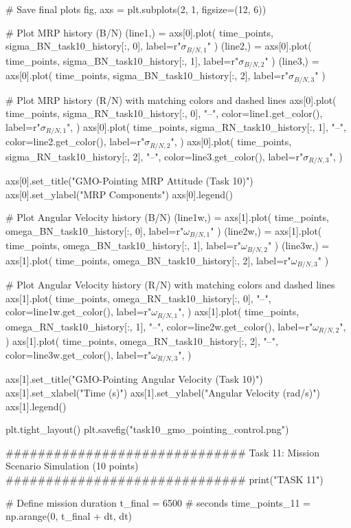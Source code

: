 \documentclass[conf]{new-aiaa}
\begin{document}
\begin{pythoncode}
# Save final plots
fig, axs = plt.subplots(2, 1, figsize=(12, 6))

# Plot MRP history (B/N)
(line1,) = axs[0].plot(
    time_points, sigma_BN_task10_history[:, 0], label=r"$\sigma_{B/N,1}$"
)
(line2,) = axs[0].plot(
    time_points, sigma_BN_task10_history[:, 1], label=r"$\sigma_{B/N,2}$"
)
(line3,) = axs[0].plot(
    time_points, sigma_BN_task10_history[:, 2], label=r"$\sigma_{B/N,3}$"
)

# Plot MRP history (R/N) with matching colors and dashed lines
axs[0].plot(
    time_points,
    sigma_RN_task10_history[:, 0],
    "--",
    color=line1.get_color(),
    label=r"$\sigma_{R/N,1}$",
)
axs[0].plot(
    time_points,
    sigma_RN_task10_history[:, 1],
    "--",
    color=line2.get_color(),
    label=r"$\sigma_{R/N,2}$",
)
axs[0].plot(
    time_points,
    sigma_RN_task10_history[:, 2],
    "--",
    color=line3.get_color(),
    label=r"$\sigma_{R/N,3}$",
)

axs[0].set_title("GMO-Pointing MRP Attitude (Task 10)")
axs[0].set_ylabel("MRP Components")
axs[0].legend()

# Plot Angular Velocity history (B/N)
(line1w,) = axs[1].plot(
    time_points, omega_BN_task10_history[:, 0], label=r"$\omega_{B/N,1}$"
)
(line2w,) = axs[1].plot(
    time_points, omega_BN_task10_history[:, 1], label=r"$\omega_{B/N,2}$"
)
(line3w,) = axs[1].plot(
    time_points, omega_BN_task10_history[:, 2], label=r"$\omega_{B/N,3}$"
)

# Plot Angular Velocity history (R/N) with matching colors and dashed lines
axs[1].plot(
    time_points,
    omega_RN_task10_history[:, 0],
    "--",
    color=line1w.get_color(),
    label=r"$\omega_{R/N,1}$",
)
axs[1].plot(
    time_points,
    omega_RN_task10_history[:, 1],
    "--",
    color=line2w.get_color(),
    label=r"$\omega_{R/N,2}$",
)
axs[1].plot(
    time_points,
    omega_RN_task10_history[:, 2],
    "--",
    color=line3w.get_color(),
    label=r"$\omega_{R/N,3}$",
)

axs[1].set_title("GMO-Pointing Angular Velocity (Task 10)")
axs[1].set_xlabel("Time (s)")
axs[1].set_ylabel("Angular Velocity (rad/s)")
axs[1].legend()

plt.tight_layout()
plt.savefig("task10_gmo_pointing_control.png")


############################## Task 11: Mission Scenario Simulation (10 points) ##############################
print("\n\nBEGIN TASK 11")

# Define mission duration
t_final = 6500  # seconds
time_points_11 = np.arange(0, t_final + dt, dt)


\end{pythoncode}
\end{document}
